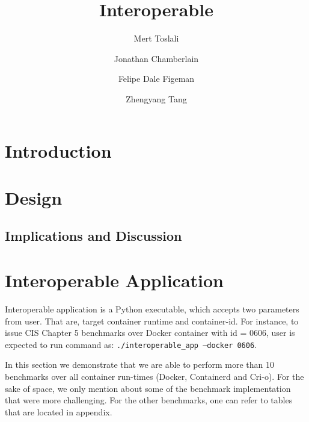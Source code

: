 \documentclass[times, twoside, watermark]{zHenriquesLab-StyleBioRxiv}
\begin{document}
\title{Interoperable}


\author[1]{Mert Toslali}
\author[1]{Jonathan Chamberlain}
\author[1]{Felipe Dale Figeman}
\author[1]{Zhengyang Tang}


\maketitle

\begin{abstract}

\end {abstract}



\section*{Introduction}


\section*{Design}


\subsection*{Implications and Discussion}





\section*{Interoperable Application}

Interoperable application is a Python executable, which accepts two parameters from user. That are, target container runtime and container-id. For instance, to issue CIS Chapter 5 benchmarks over Docker container with id = 0606, user is expected to run command as:
\texttt{./interoperable\_app --docker 0606}.



In this section we demonstrate that we are able to perform more than 10 benchmarks over all container run-times (Docker, Containerd and Cri-o). For the sake of space, we only
mention about some of the benchmark implementation that were more challenging. For the other benchmarks, one can refer to tables that are located in appendix.



\end{document}
